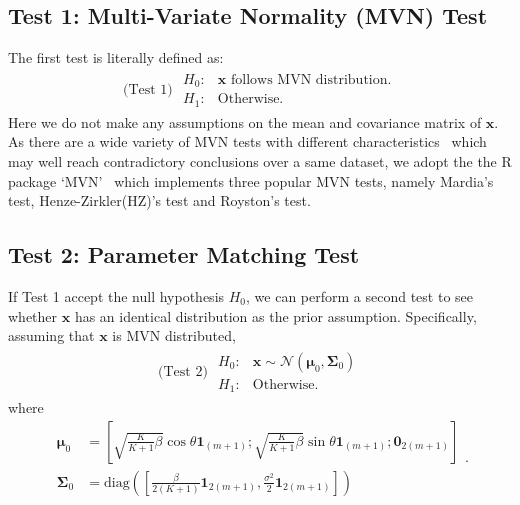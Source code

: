 \documentclass[journal,draftcls,onecolumn,12pt,twoside]{IEEEtran}
\begin{document}
\subsection{Test 1: Multi-Variate Normality (MVN) Test}
The first test is literally defined as:
\begin{align}
  \mbox{(Test 1) } \begin{array}{ll}H_0: & \mathbf{x}\mbox{ follows MVN
  distribution.} \\ H_1: & \mbox{Otherwise.} \end{array}
\end{align}
Here we do not make any assumptions on the mean and covariance matrix of
$\mathbf{x}$. As there are a wide variety of MVN tests with different
characteristics~\cite{mecklin2005monte} which may well reach contradictory
conclusions over a same dataset, we adopt the the R package
`MVN'~\cite{korkmaz2014mvn} which implements three popular MVN tests,
namely Mardia's test, Henze-Zirkler(HZ)'s test and Royston's test.

\subsection{Test 2: Parameter Matching Test}
If Test 1 accept the null hypothesis $H_0$, we can
perform a second test to see whether $\mathbf{x}$ has an identical distribution
as the prior assumption. Specifically, assuming that $\mathbf{x}$ is MVN
distributed,
\begin{align}
  \mbox{(Test 2) } \begin{array}{ll}H_0: & \mathbf{x}\sim
  \mathcal{N}(\bm{\mu}_0, \mathbf{\Sigma}_0) \\ H_1: &
  \mbox{Otherwise.}
  \end{array}
\end{align}
where
\begin{subequations}
  \begin{align}
    \bm{\mu}_0 & =
    \left[\sqrt{\frac{K}{K+1}\beta}\cos\theta\mathbf{1}_{(m+1)};
    \sqrt{\frac{K}{K+1}\beta}\sin\theta\mathbf{1}_{(m+1)};
    \mathbf{0}_{2(m+1)}\right]
    \\
    \mathbf{\Sigma}_0 & =
    \mbox{diag}\left(\left[\frac{\beta}{2(K+1)}\mathbf{1}_{2(m+1)},
    \frac{\sigma^2}{2}\mathbf{1}_{2(m+1)}\right]\right) 
  \end{align}.
  \label{eq:mu0Sigma0}
\end{subequations}
\end{document}

